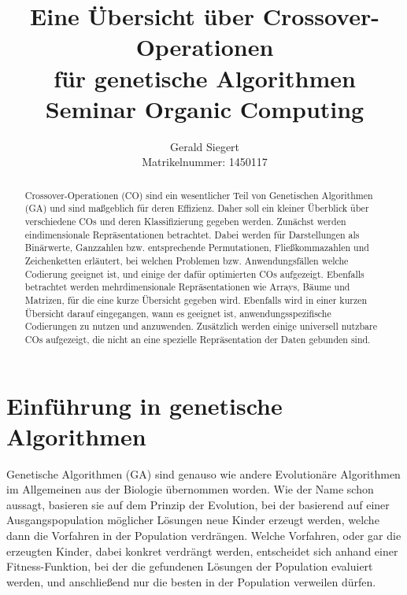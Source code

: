 \documentclass{llncs}
\begin{document}
\mainmatter

\title{Eine Übersicht über Crossover-Operationen\\
	für genetische Algorithmen\\
	Seminar Organic Computing}

\author{Gerald Siegert\\
	Matrikelnummer: 1450117}
\tocauthor{}


\maketitle


\begin{abstract}
	Crossover-Operationen (CO) sind ein wesentlicher Teil von Genetischen Algorithmen (GA) und sind maßgeblich für deren Effizienz. Daher soll ein kleiner Überblick über verschiedene COs und deren Klassifizierung gegeben werden. Zunächst werden eindimensionale Re\-prä\-sen\-ta\-ti\-on\-en betrachtet. Dabei werden für Darstellungen als Binärwerte, Ganzzahlen bzw. entsprechende Permutationen, Fließkommazahlen und Zeichenketten erläutert, bei welchen Problemen bzw. Anwendungsfällen welche Codierung geeignet ist, und einige der dafür optimierten COs aufgezeigt. Ebenfalls betrachtet werden mehrdimensionale Re\-prä\-sen\-ta\-ti\-on\-en wie Arrays, Bäume und Matrizen, für die eine kurze Übersicht gegeben wird. Ebenfalls wird in einer kurzen Übersicht darauf eingegangen, wann es geeignet ist, anwendungsspezifische Co\-die\-rungen zu nutzen und anzuwenden. Zu\-sätz\-lich werden  einige universell nutzbare COs aufgezeigt, die nicht an eine spezielle Repräsentation der Daten gebunden sind.
\end{abstract}

\pagebreak

\section{Einführung in genetische Algorithmen}
\label{sec:EinfGA}

	Genetische Algorithmen (GA) sind genauso wie andere Evolutionäre Algorithmen im Allgemeinen aus der Biologie übernommen worden. Wie der Name schon aussagt, basieren sie auf dem Prinzip der Evolution, bei der basierend auf einer Ausgangspopulation möglicher Lösungen neue Kinder erzeugt werden, welche dann die Vorfahren in der Population verdrängen. Welche Vorfahren, oder gar die erzeugten Kinder, dabei konkret verdrängt werden, entscheidet sich anhand einer Fitness-Funktion, bei der die gefundenen Lösungen der Population evaluiert werden, und anschließend nur die besten in der Population verweilen dürfen.
	
\end{document}
